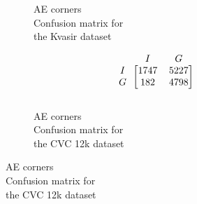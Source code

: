 \begin{figure}[h]
\begin{subfigure}[b]{0.49\textwidth}
        
\caption{AE corners \\Confusion matrix for\\ the Kvasir dataset}
\label{mat:kvasir_CM_DN121_AE_CORNER}
\end{subfigure}
\begin{subfigure}[b]{0.25\textwidth}
        \[
\begin{blockarray}{ccc}
& I & G  \\
\begin{block}{c[cc]}
 		I&1747 & 5227\\
        G&182  & 4798\\
\end{block}
\end{blockarray}
\]   
\caption{AE corners \\Confusion matrix for\\ the CVC 12k dataset}
\label{mat:cvc12k_CM_DN121_AE_CORNER}
\end{subfigure}

\vspace{1cm}


\end{figure}
